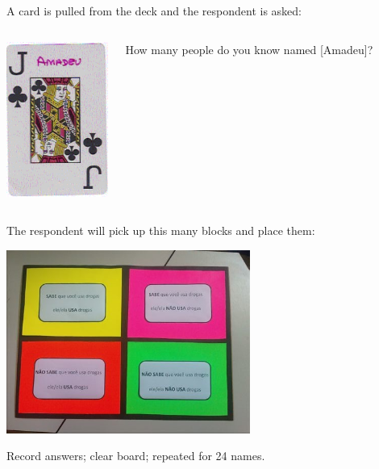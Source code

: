 \documentclass[aspectratio=169]{beamer}
\begin{document}
\begin{frame}

A card is pulled from the deck and the respondent is asked:

\begin{columns}[c]
\column{2in}
\begin{center}
\includegraphics[height=2in]{figures/amadeu_card}
\end{center}

\column{3in}
How many people do you know named [Amadeu]?
\end{columns}

\end{frame}
\begin{frame}

The respondent will pick up this many blocks and place them:\\
\begin{center}
\includegraphics[angle=90, width=0.6\textwidth]{figures/jogo_board}
\end{center}
\vfill
Record answers; clear board; repeated for 24 names. 

\end{frame}
\end{document}
